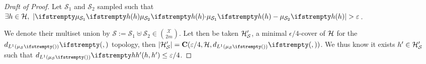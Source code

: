 \begin{proof}[Draft of Proof]
	Let $\mathcal{S}_1$ and $\mathcal{S}_2$ sampled such that $\exists \threequery \in \threeqset,\ \dnude{\nu}{\empdistr{\mathcal{S}_1}{\threequery}}{\empdistr{\mathcal{S}_2}{\threequery}} > \epsilon$. 
	
	We denote their multiset union by $\mathcal{S} := \mathcal{S}_1 \uplus \mathcal{S}_2 \in \binom{\mathcal{X}}{2m}$. Let then be taken $\mathcal{H}'_{\mathcal{S}}$, a minimal $\epsilon/4$-cover of $\mathcal{H}$ for the $\dlone{\empdistr{\mathcal{S}}{}}{}{}$ topology, then $|\threeqset'_{\mathcal{S}}| = \covering(\epsilon/4, \threeqset, \dlone{\empdistr{\mathcal{S}}{}}{}{})$. We thus know it exists $h' \in \mathcal{H}'_{\mathcal{S}}$ such that $\dlone{\empdistr{\mathcal{S}}{}}{\threequery}{\threequery'} \leq \epsilon/4$.



\end{proof}
